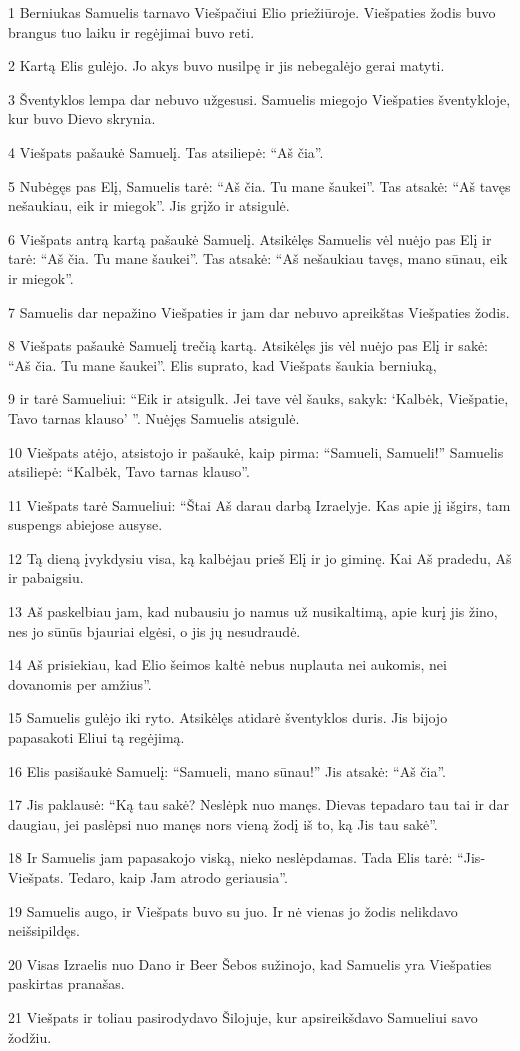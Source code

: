 \par 1 Berniukas Samuelis tarnavo Viešpačiui Elio priežiūroje. Viešpaties žodis buvo brangus tuo laiku ir regėjimai buvo reti. 
\par 2 Kartą Elis gulėjo. Jo akys buvo nusilpę ir jis nebegalėjo gerai matyti. 
\par 3 Šventyklos lempa dar nebuvo užgesusi. Samuelis miegojo Viešpaties šventykloje, kur buvo Dievo skrynia. 
\par 4 Viešpats pašaukė Samuelį. Tas atsiliepė: “Aš čia”. 
\par 5 Nubėgęs pas Elį, Samuelis tarė: “Aš čia. Tu mane šaukei”. Tas atsakė: “Aš tavęs nešaukiau, eik ir miegok”. Jis grįžo ir atsigulė. 
\par 6 Viešpats antrą kartą pašaukė Samuelį. Atsikėlęs Samuelis vėl nuėjo pas Elį ir tarė: “Aš čia. Tu mane šaukei”. Tas atsakė: “Aš nešaukiau tavęs, mano sūnau, eik ir miegok”. 
\par 7 Samuelis dar nepažino Viešpaties ir jam dar nebuvo apreikštas Viešpaties žodis. 
\par 8 Viešpats pašaukė Samuelį trečią kartą. Atsikėlęs jis vėl nuėjo pas Elį ir sakė: “Aš čia. Tu mane šaukei”. Elis suprato, kad Viešpats šaukia berniuką, 
\par 9 ir tarė Samueliui: “Eik ir atsigulk. Jei tave vėl šauks, sakyk: ‘Kalbėk, Viešpatie, Tavo tarnas klauso’ ”. Nuėjęs Samuelis atsigulė. 
\par 10 Viešpats atėjo, atsistojo ir pašaukė, kaip pirma: “Samueli, Samueli!” Samuelis atsiliepė: “Kalbėk, Tavo tarnas klauso”. 
\par 11 Viešpats tarė Samueliui: “Štai Aš darau darbą Izraelyje. Kas apie jį išgirs, tam suspengs abiejose ausyse. 
\par 12 Tą dieną įvykdysiu visa, ką kalbėjau prieš Elį ir jo giminę. Kai Aš pradedu, Aš ir pabaigsiu. 
\par 13 Aš paskelbiau jam, kad nubausiu jo namus už nusikaltimą, apie kurį jis žino, nes jo sūnūs bjauriai elgėsi, o jis jų nesudraudė. 
\par 14 Aš prisiekiau, kad Elio šeimos kaltė nebus nuplauta nei aukomis, nei dovanomis per amžius”. 
\par 15 Samuelis gulėjo iki ryto. Atsikėlęs atidarė šventyklos duris. Jis bijojo papasakoti Eliui tą regėjimą. 
\par 16 Elis pasišaukė Samuelį: “Samueli, mano sūnau!” Jis atsakė: “Aš čia”. 
\par 17 Jis paklausė: “Ką tau sakė? Neslėpk nuo manęs. Dievas tepadaro tau tai ir dar daugiau, jei paslėpsi nuo manęs nors vieną žodį iš to, ką Jis tau sakė”. 
\par 18 Ir Samuelis jam papasakojo viską, nieko neslėpdamas. Tada Elis tarė: “Jis­Viešpats. Tedaro, kaip Jam atrodo geriausia”. 
\par 19 Samuelis augo, ir Viešpats buvo su juo. Ir nė vienas jo žodis nelikdavo neišsipildęs. 
\par 20 Visas Izraelis nuo Dano ir Beer Šebos sužinojo, kad Samuelis yra Viešpaties paskirtas pranašas. 
\par 21 Viešpats ir toliau pasirodydavo Šilojuje, kur apsireikšdavo Samueliui savo žodžiu.



